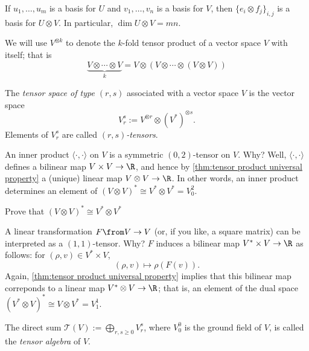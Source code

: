 \begin{proposition}\label{prop:tensor basis}
	If $u_1, \dots , u_m$ is a basis for $U$ and $v_1, \dots , v_n$ is a basis for $V$, then $\{e_i \otimes f_j\}_{i,j}$ is a basis for $U \otimes V$. In particular, $\dim U \otimes V = mn$.
\end{proposition}

\begin{notation}
	We will use $V^{\otimes k}$ to denote the $k$-fold tensor product of a vector space $V$ with itself; that is
	\[
		\underbrace{V \otimes \cdots \otimes V}_k = V \otimes (V \otimes \cdots \otimes (V \otimes V))
	\]
\end{notation}

\begin{definition}\label{def:tensor space}
	The \emph{tensor space of type $(r,s)$} associated with a vector space $V$ is the vector space
	\[
		V_r^s := V^{\otimes r} \otimes (V^\ast)^{\otimes s}.
	\]
	Elements of $V_r^s$ are called \emph{$(r,s)$-tensors}.
\end{definition}

\begin{example}
	An inner product $\langle \cdot , \cdot \rangle$ on $V$ is a symmetric $(0,2)$-tensor on $V$. Why? Well, $\langle \cdot , \cdot \rangle$ defines a bilinear map $V \times V \to \R$, and hence by \cref{thm:tensor product universal property} a (unique) linear map $V \otimes V \to \R$. In other words, an inner product determines an element of $(V \otimes V)^\ast \cong V^\ast \otimes V^\ast = V_0^2$.
	\begin{exercise}
		Prove that $(V \otimes V)^\ast \cong V^\ast \otimes V^\ast$
	\end{exercise}
\end{example}

\begin{example}
	A linear transformation $F\from V \to V$ (or, if you like, a square matrix) can be interpreted as a $(1,1)$-tensor. Why? $F$ induces a bilinear map $V^\ast \times V \to \R$ as follows: for $(\rho,v) \in V^\ast \times V$,
	\[
		(\rho, v ) \mapsto \rho(F(v)).
	\]
	Again, \cref{thm:tensor product universal property} implies that this bilinear map correponds to a linear map $V^\ast \otimes V \to \R$; that is, an element of the dual space $(V^\ast \otimes V)^\ast \cong V \otimes V^\ast = V_1^1$.
\end{example}

\begin{definition}\label{def:tensor algebra}
	The direct sum $\displaystyle \mathcal{T}(V):= \bigoplus_{r,s \geq 0} V_r^s$, where $V_0^0$ is the ground field of $V$, is called the \emph{tensor algebra} of $V$.
\end{definition}

